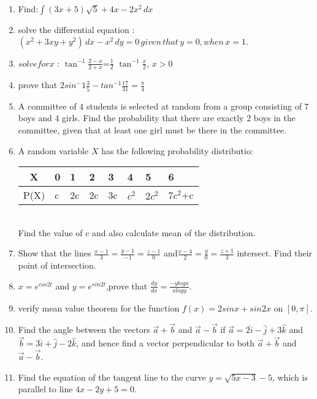 \documentclass[12pt,-letter paper]{article}
\begin{document}
\begin{enumerate}
\item Find:$
\int (3x + 5)\sqrt{5} + 4x - 2x^2 \, dx
$
\item solve the differential equation :
	$ (x^2 + 3xy + y^2) \, dx - x^2 \, dy = 0 \, given \, that\,  y = 0, when \,  x = 1.$


\item  $solve for x$ : $\tan^{-1}\frac{2-x}{2+x}$=$\frac{1}{2}$ $\tan^{-1}\frac{x}{2}$, $x>0$
	
\item  prove that $2sin^-1\frac{3}{5}-tan^{-1}\frac{17}{31}=\frac{\pi}{4}$
\item A committee of $4$ students is selected at random from a group consisting of $7$ boys and $4$ girls. Find the probability that there are exactly $2$ boys in the committee, given that at least one girl must be there in the committee.
\item A random variable $X$ has the following probability distributio: \\\begin{table}[htb]
 \centering
  \begin{tabularx}{\textwidth}{|c|X|X|X|X|X|X|X|}
 \hline
 X & 0 & 1 & 2 & 3 & 4 & 5 & 6 \\
  \hline
 P(X) & c & 2c & 2c & 3c & $c^2$ & $2c^2$ & $7c^2$+c \\
  \hline
  \end{tabularx}                                                   \end{table}\\
	Find the value of $c$ and also calculate mean of the distribution.
 \item Show that the lines $\frac{x-1}{3}=\frac{y-1}{-1}=\frac{z-1}{0}$ and$\frac{x-4}{2}=\frac{y}{0}=\frac{z+1}{3}$  intersect. Find their point of intersection.
\item $x=e^{cos2t}$ and $y=e^{sin2t}$,prove that $\frac{dy}{dx}=\frac{-ylogx}{xlogy}$.
\item verify mean value theorem for the function $f(x)=2sinx+sin2x$ on $[0,\pi]$.
\item Find the angle  between the vectors $\overrightarrow{a}+\overrightarrow{b}$ and $\overrightarrow{a}-\overrightarrow{b}$ if $\overrightarrow{a}=2\hat{i}-\hat{j}+3\hat{k}$ and $\overrightarrow{b}=3\hat{i}+\hat{j}-2\hat{k}$, and hence find a vector perpendicular to both $\overrightarrow{a}+\overrightarrow{b}$ and $\overrightarrow{a}-\overrightarrow{b}$.
\item Find the equation of the tangent line to the curve $y=\sqrt{5x-3}-5$, which is parallel to line $4x-2y+5=0$.

\end{enumerate}
\end{document}
